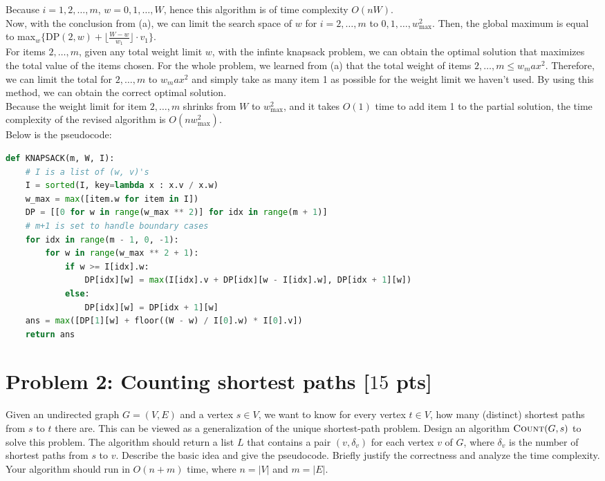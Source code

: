 \documentclass[11pt,twoside]{article}
\newcommand{\problem}[1]{\section*{Problem #1}}
\newenvironment{solution}{{\par\noindent\it Solution.}}{}
\begin{document}
\begin{solution}
Because $i=1,2,\dots,m$, $w=0,1,\dots,W$, hence this algorithm is of time complexity $O(nW)$.
\vspace{10pt}\\
Now, with the conclusion from (a), we can limit the search space of $w$ for $i=2,\dots,m$ to $0,1,\dots,w_{\text{max}}^2$.
Then, the global maximum is equal to max$_{w}\{\text{DP}(2,w)+\lfloor\frac{W-w}{w_1}\rfloor\cdot v_1\}$.
\vspace{10pt}\\
For items $2,\dots,m$, given any total weight limit $w$, with the infinte knapsack problem,
we can obtain the optimal solution that maximizes the total value of the items chosen. 
For the whole problem, we learned from (a) that the total weight of items $2,\dots,m\leq w_max^2$. 
Therefore, we can limit the total for $2,\dots,m$ to $w_max^2$ and simply take as many item 1 as possible for the weight limit we haven't used.
By using this method, we can obtain the correct optimal solution.
\vspace{10pt}\\
Because the weight limit for item $2,\dots,m$ shrinks from $W$ to $w_{\text{max}}^2$, and it takes $O(1)$ time to add item 1 to the partial solution,
the time complexity of the revised algorithm is $O(nw_{\text{max}}^2)$.
\vspace{10pt}\\
Below is the pseudocode:
\begin{lstlisting}[language=Python]
def KNAPSACK(m, W, I):
    # I is a list of (w, v)'s
    I = sorted(I, key=lambda x : x.v / x.w)
    w_max = max([item.w for item in I])
    DP = [[0 for w in range(w_max ** 2)] for idx in range(m + 1)] 
    # m+1 is set to handle boundary cases
    for idx in range(m - 1, 0, -1):
        for w in range(w_max ** 2 + 1):
            if w >= I[idx].w:
                DP[idx][w] = max(I[idx].v + DP[idx][w - I[idx].w], DP[idx + 1][w])
            else:
                DP[idx][w] = DP[idx + 1][w]
    ans = max([DP[1][w] + floor((W - w) / I[0].w) * I[0].v])
    return ans
\end{lstlisting}

\end{solution}

\problem{2: Counting shortest paths [$15$ pts]}
Given an undirected graph $G = (V,E)$ and a vertex $s \in V$, we want to know for every vertex $t \in V$, how many (distinct) shortest paths from $s$ to $t$ there are.
This can be viewed as a generalization of the unique shortest-path problem.
Design an algorithm $\textsc{Count}(G,s)$ to solve this problem.
The algorithm should return a list $L$ that contains a pair $(v,\delta_v)$ for each vertex $v$ of $G$, where $\delta_v$ is the number of shortest paths from $s$ to $v$.
Describe the basic idea and give the pseudocode.
Briefly justify the correctness and analyze the time complexity.
Your algorithm should run in $O(n+m)$ time, where $n = |V|$ and $m = |E|$.
\end{document}
